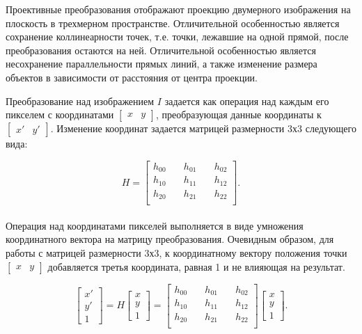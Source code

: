 {{	Проективные преобразования отображают проекцию двумерного изображения на плоскость в трехмерном пространстве. Отличительной особенностью является сохранение коллинеарности точек, т.е. точки, лежавшие на одной прямой, после преобразования остаются на ней. Отличительной особенностью является несохранение параллельности прямых линий, а также изменение размера объектов в зависимости от расстояния от центра проекции.
	
	Преобразование над изображением $I$ задается как операция над каждым его пикселем с координатами $\begin{bmatrix}x&y\end{bmatrix}$, преобразующая данные координаты к $\begin{bmatrix}x'&y'\end{bmatrix}$. Изменение координат задается матрицей размерности 3х3 следующего вида:
	
	$$
	H = 
	\begin{bmatrix}
	h_{00} &\quad h_{01} &\quad h_{02} \\
	h_{10} &\quad h_{11} &\quad h_{12} \\
	h_{20} &\quad h_{21} &\quad h_{22} \\
	\end{bmatrix}.
	$$	
	\\
	
	Операция над координатами пикселей выполняется в виде умножения координатного вектора на матрицу преобразования. Очевидным образом, для работы с матрицей размерности 3х3, к координатному вектору положения точки $\begin{bmatrix}x&y\end{bmatrix}$ добавляется третья координата, равная 1 и не влияющая на результат.
	
	$$
	\begin{bmatrix}x'\\y'\\1\end{bmatrix} = 
	H\begin{bmatrix}x\\y\\1\end{bmatrix} = 
	\begin{bmatrix}
	h_{00} &\quad h_{01} &\quad h_{02} \\
	h_{10} &\quad h_{11} &\quad h_{12} \\
	h_{20} &\quad h_{21} &\quad h_{22} \\
	\end{bmatrix}
	\begin{bmatrix}x\\y\\1\end{bmatrix}.
	$$\\
	
}}
